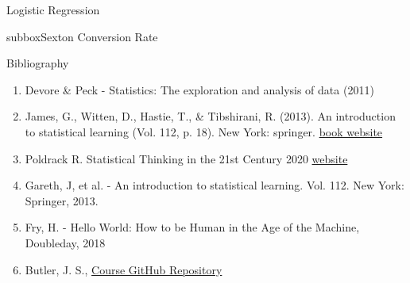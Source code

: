 \documentclass[10pt,a4paper]{article}
\begin{document}
\begin{multicols}{3}
\begin{textbox}{Logistic Regression}
\begin{subbox}{subbox}{Sexton Conversion Rate}
\end{subbox}
\end{textbox}
\begin{textbox}{Bibliography}
\begin{enumerate}
\item 
Devore \& Peck  - Statistics: The exploration and analysis of data (2011)
\item James, G., Witten, D., Hastie, T., \& Tibshirani, R. (2013). An introduction to statistical learning (Vol. 112, p. 18). New York: springer. 
\href{http://faculty.marshall.usc.edu/gareth-james/ISL/}{book website}
\item Poldrack R. Statistical Thinking in the 21st Century 2020 \href{https://statsthinking21.github.io/statsthinking21-core-site/index.html}{website}
\item
Gareth, J, et al. - An introduction to statistical learning. Vol. 112. New York: Springer, 2013.
\item
Fry, H. - Hello World: How to be Human in the Age of the Machine, Doubleday, 2018
\item Butler, J. S., \href{https://github.com/john-s-butler-dit/Probability_and_Statistical_Inference}{Course GitHub Repository}  

\end{enumerate}


\end{textbox}

\end{multicols}
\end{document}

